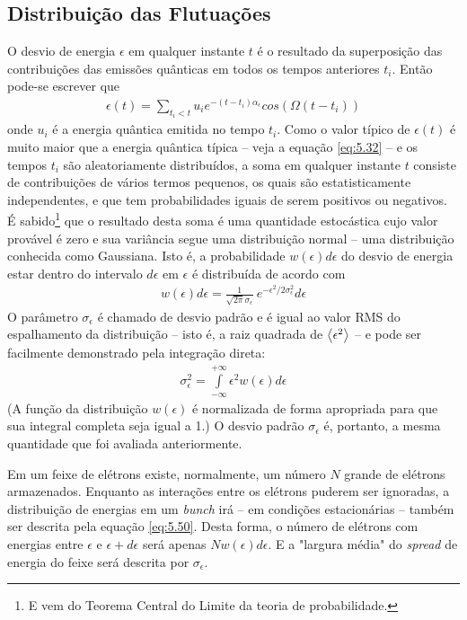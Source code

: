 \subsection{Distribuição das Flutuações}\label{sec:5.3}
O desvio de energia $\epsilon$ em qualquer instante $t$ é o resultado da superposição das contribuições das emissões quânticas em todos os tempos anteriores $t_i$. Então pode-se escrever que
\begin{align}
	\epsilon(t) = \sum\limits_{t_i<t}^{}u_i e^{-(t-t_i)\alpha_\epsilon}cos(\Omega(t-t_i))\label{eq:5.49}
\end{align}
onde $u_i$ é a energia quântica emitida no tempo $t_i$. Como o valor típico de $\epsilon(t)$ é muito maior que a energia quântica típica -- veja a equação \eqref{eq:5.32} -- e os tempos $t_i$ são aleatoriamente distribuídos, a soma em qualquer instante $t$ consiste de contribuições de vários termos pequenos, os quais são estatisticamente independentes, e que tem probabilidades iguais de serem positivos ou negativos. É sabido\footnote{E vem do Teorema Central do Limite da teoria de probabilidade.} que o resultado desta soma é uma quantidade estocástica cujo valor provável é zero e sua variância segue uma distribuição normal -- uma distribuição conhecida como Gaussiana. Isto é, a probabilidade $w(\epsilon)d\epsilon$ do desvio de energia estar dentro do intervalo $d\epsilon$ em $\epsilon$ é distribuída de acordo com
\begin{align}
	w(\epsilon)d\epsilon = \frac{1}{\sqrt{2\pi}\sigma_\epsilon}\ e^{-\epsilon^2/2\sigma_\epsilon^2}d\epsilon\label{eq:5.50}
\end{align}
O parâmetro $\sigma_\epsilon$ é chamado de desvio padrão e é igual ao valor RMS do espalhamento da distribuição -- isto é, a raiz quadrada de $\left< \epsilon^2 \right>$ -- e pode ser facilmente demonstrado pela integração direta:
\begin{align}
	\sigma_\epsilon^2 = \int\limits_{-\infty}^{+\infty}\epsilon^2w(\epsilon)d\epsilon
\end{align}
(A função da distribuição $w(\epsilon)$ é normalizada de forma apropriada para que sua integral completa seja igual a 1.) O desvio padrão $\sigma_\epsilon$ é, portanto, a mesma quantidade que foi avaliada anteriormente.

Em um feixe de elétrons existe, normalmente, um número $N$ grande de elétrons armazenados. Enquanto as interações entre os elétrons puderem ser ignoradas, a distribuição de energias em um \textit{bunch} irá -- em condições estacionárias -- também ser descrita pela equação \eqref{eq:5.50}. Desta forma, o número de elétrons com energias entre $\epsilon$ e $\epsilon + d\epsilon$ será apenas $Nw(\epsilon)d\epsilon$. E a "largura média" do \textit{spread} de energia do feixe será descrita por $\sigma_\epsilon$.

